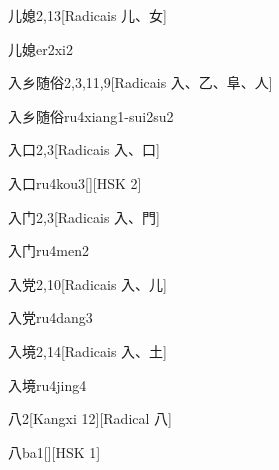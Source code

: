 \begin{entry}{儿媳}{2,13}[Radicais ⼉、⼥]
  \begin{phonetics}{儿媳}{er2xi2}
  \end{phonetics}
\end{entry}

\begin{entry}{入乡随俗}{2,3,11,9}[Radicais ⼊、⼄、⾩、⼈]
  \begin{phonetics}{入乡随俗}{ru4xiang1-sui2su2}
  \end{phonetics}
\end{entry}

\begin{entry}{入口}{2,3}[Radicais ⼊、⼝]
  \begin{phonetics}{入口}{ru4kou3}[][HSK 2]
  \end{phonetics}
\end{entry}

\begin{entry}{入门}{2,3}[Radicais ⼊、⾨]
  \begin{phonetics}{入门}{ru4men2}
  \end{phonetics}
\end{entry}

\begin{entry}{入党}{2,10}[Radicais ⼊、⼉]
  \begin{phonetics}{入党}{ru4dang3}
  \end{phonetics}
\end{entry}

\begin{entry}{入境}{2,14}[Radicais ⼊、⼟]
  \begin{phonetics}{入境}{ru4jing4}
  \end{phonetics}
\end{entry}

\begin{entry}{八}{2}[Kangxi 12][Radical ⼋]
  \begin{phonetics}{八}{ba1}[][HSK 1]
  \end{phonetics}
\end{entry}


